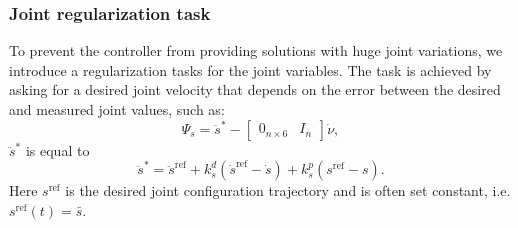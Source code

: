 \subsubsection{Joint regularization task}
To prevent the controller from providing solutions with huge joint variations, we introduce a regularization tasks for the joint variables. The task is achieved by asking for a desired joint velocity that depends on the error between the desired and measured joint values, such as:
\begin{equation}
    \label{eq:tsid_s_task}
    \Psi_s = \ddot{s}^* - \begin{bmatrix}
    0_{n\times6} & I_n 
    \end{bmatrix} \dot{\nu},
\end{equation}
$\ddot{s}^*$ is equal to
\begin{equation}
    \ddot{s}^* = \ddot{s}^\text{ref} + k_s^d (\dot{s}^\text{ref} - \dot{s}) + k_s^p (s^\text{ref} - s).
\end{equation}
Here $s^\text{ref}$ is the desired joint configuration trajectory and is often set constant, i.e. $s^\text{ref}(t) = \bar{s}$.


